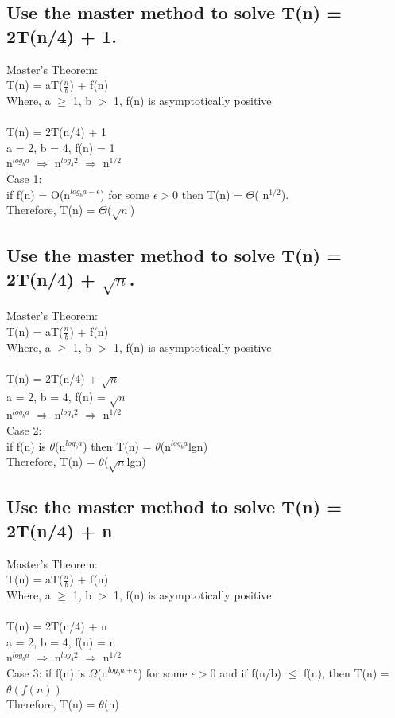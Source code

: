 \documentclass[10pt,letterpaper]{article}
\begin{document}
\subsection{Use the master method to solve T(n) = 2T(n/4) + 1.}
Master's Theorem:\\
T(n) = aT($\frac{n}{b}$) + f(n)\\
Where, a $\geq$ 1, b $>$ 1, f(n) is asymptotically positive\\
\\
T(n) = 2T(n/4) + 1\\
a = 2, b = 4, f(n) = 1\\
n$^{log_{b}a}$ $\Rightarrow$ n$^{log_{4}2}$ $\Rightarrow$ n$^{1/2}$\\
Case 1:\\
if f(n) = O(n$^{log_{b}a - \epsilon}$) for some $\epsilon > 0$ then T(n) = $\Theta$( n$^{1/2}$).\\
Therefore, T(n) =  $\Theta$($\sqrt{n}$)

\subsection{Use the master method to solve T(n) = 2T(n/4) + $\sqrt{n}$.}
Master's Theorem:\\
T(n) = aT($\frac{n}{b}$) + f(n)\\
Where, a $\geq$ 1, b $>$ 1, f(n) is asymptotically positive\\
\\
T(n) = 2T(n/4) + $\sqrt{n}$\\
a = 2, b = 4, f(n) = $\sqrt{n}$\\
n$^{log_{b}a}$ $\Rightarrow$ n$^{log_{4}2}$ $\Rightarrow$ n$^{1/2}$\\
Case 2:\\
if f(n) is $\theta$(n$^{log_{b}a}$) then T(n) = $\theta$(n$^{log_{b}a}$lgn)\\
Therefore, T(n) = $\theta$($\sqrt{n}$lgn)\\

\subsection{Use the master method to solve T(n) = 2T(n/4) + n}
Master's Theorem:\\
T(n) = aT($\frac{n}{b}$) + f(n)\\
Where, a $\geq$ 1, b $>$ 1, f(n) is asymptotically positive\\
\\
T(n) = 2T(n/4) + n\\
a = 2, b = 4, f(n) = n\\
n$^{log_{b}a}$ $\Rightarrow$ n$^{log_{4}2}$ $\Rightarrow$ n$^{1/2}$\\
Case 3:
if f(n) is $\Omega$(n$^{log_{b}a + \epsilon}$) for some $\epsilon > 0$ and if f(n/b) $\leq$ f(n), then T(n) = $\theta(f(n))$\\
Therefore, T(n) = $\theta$(n)
\end{document}
